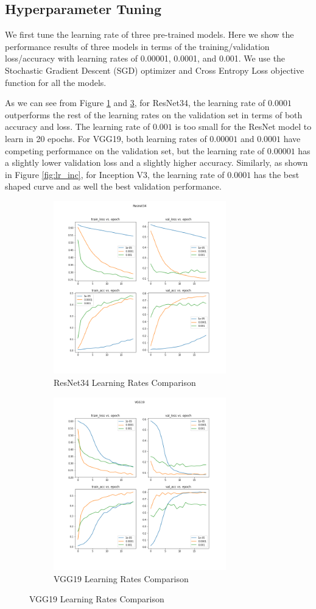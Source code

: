\documentclass{article}
\begin{document}
\subsection{Hyperparameter Tuning}
We first tune the learning rate of three pre-trained models. Here we show the performance results of three models in terms of the training/validation loss/accuracy with learning rates of 0.00001, 0.0001, and 0.001. We use the Stochastic Gradient Descent (SGD) optimizer and Cross Entropy Loss objective function for all the models.

As we can see from Figure \ref{fig:lr_resnet} and \ref{fig:lr_vgg}, for ResNet34, the learning rate of $0.0001$ outperforms the rest of the learning rates on the validation set in terms of both accuracy and loss. The learning rate of $0.001$ is too small for the ResNet model to learn in 20 epochs. For VGG19, both learning rates of $0.00001$ and $0.0001$ have competing performance on the validation set, but the learning rate of $0.00001$ has a slightly lower validation loss and a slightly higher accuracy. Similarly, as shown in Figure \ref{fig:lr_inc}, for Inception V3, the learning rate of $0.0001$ has the best shaped curve and as well the best validation performance.
\begin{figure}[h!]
    \centering
    \begin{subfigure}{.5\textwidth}
    \centering
    \includegraphics[height=7.5cm]{Resnet34 LR.png}
    \caption{ResNet34 Learning Rates Comparison}
    \label{fig:lr_resnet}
    \end{subfigure}%
    \begin{subfigure}{.5\textwidth}
    \centering
    \includegraphics[height=7.5cm]{VGG19 LR.png}
    \caption{VGG19 Learning Rates Comparison}
    \label{fig:lr_vgg}
    \end{subfigure}
\end{figure}
\end{document}

